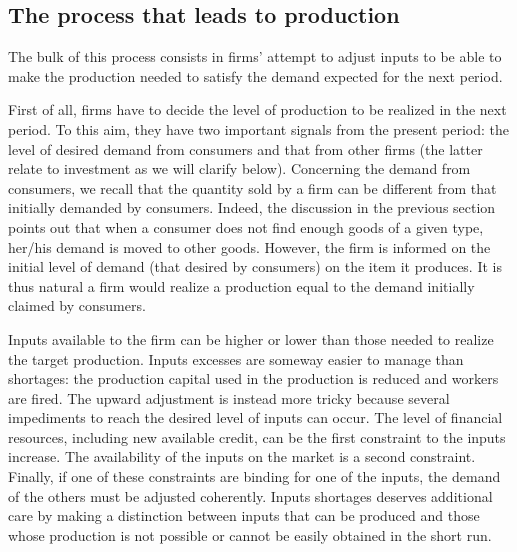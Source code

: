 \documentclass{book}
\begin{document}
\subsection{The process that leads to production}

The bulk of this process consists in firms' attempt to adjust inputs to be able to make the production needed to satisfy the demand expected for the next period.

First of all, firms have to decide the level of production to be realized in the next period. To this aim, they have two important signals from the present period: the level of desired demand from consumers and that from other firms (the latter relate to investment as we will clarify below).
Concerning the demand from consumers, we recall that the quantity sold by a firm can be different from that initially demanded by consumers. Indeed, the discussion in the previous section points out that when a consumer does not find enough goods of a given type, her/his demand is moved
to other goods.
However, the firm is informed on the initial level of demand (that desired by consumers) on the item it produces. It is thus natural a firm would realize a production equal to the demand initially claimed by consumers.  


Inputs available to the firm can be higher or lower than those needed to realize the target production. Inputs excesses are someway easier to manage than shortages: the production capital used in the production is reduced and workers are fired.
The upward adjustment is instead more tricky because 
several impediments to reach the desired level of inputs can occur.
The level of financial resources, including new available credit, can be the first constraint to the inputs increase. The availability of the inputs on the market is a second constraint. Finally, if one of these constraints are binding for one of the inputs, the demand of the others must be adjusted coherently. Inputs shortages deserves additional care by making a distinction between inputs that can be produced and those whose production is not possible or cannot be easily obtained in the short run. 
\end{document}
